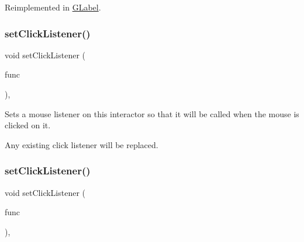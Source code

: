 Reimplemented in \mbox{\hyperlink{classsgl_1_1GLabel_adb836652705fdc4b7e90b7a3afc56a37}{G\+Label}}.

\mbox{\label{classsgl_1_1GInteractor_abd40af6921242584d0954f173911b190}} 
\subsubsection{\texorpdfstring{set\+Click\+Listener()}{setClickListener()}\hspace{0.1cm}{\footnotesize\ttfamily [1/2]}}
{\footnotesize\ttfamily void set\+Click\+Listener (\begin{DoxyParamCaption}\item[{\mbox{\hyperlink{namespacesgl_ae9f3e9eab70035da1a2b114e21357b25}{G\+Event\+Listener}}}]{func }\end{DoxyParamCaption})\hspace{0.3cm}{\ttfamily [virtual]}, {\ttfamily [inherited]}}



Sets a mouse listener on this interactor so that it will be called when the mouse is clicked on it. 

Any existing click listener will be replaced. \mbox{\label{classsgl_1_1GInteractor_a856414c92df90f56f3877475eb3f8fc4}} 
\subsubsection{\texorpdfstring{set\+Click\+Listener()}{setClickListener()}\hspace{0.1cm}{\footnotesize\ttfamily [2/2]}}
{\footnotesize\ttfamily void set\+Click\+Listener (\begin{DoxyParamCaption}\item[{\mbox{\hyperlink{namespacesgl_a54427ce97bb1c2804e4fe2b0a62e8b17}{G\+Event\+Listener\+Void}}}]{func }\end{DoxyParamCaption})\hspace{0.3cm}{\ttfamily [virtual]}, {\ttfamily [inherited]}}



